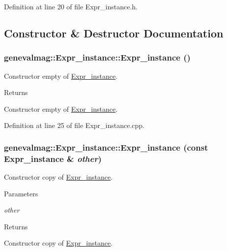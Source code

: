Definition at line 20 of file Expr\_\-instance.h.



\subsection{Constructor \& Destructor Documentation}
\hypertarget{classgenevalmag_1_1Expr__instance_af83f87581558a7d2c05f18a1678050a2}{
\subsubsection[{Expr\_\-instance}]{\setlength{\rightskip}{0pt plus 5cm}genevalmag::Expr\_\-instance::Expr\_\-instance ()}}
\label{classgenevalmag_1_1Expr__instance_af83f87581558a7d2c05f18a1678050a2}
Constructor empty of \hyperlink{classgenevalmag_1_1Expr__instance}{Expr\_\-instance}. \begin{DoxyReturn}{Returns}

\end{DoxyReturn}
Constructor empty of \hyperlink{classgenevalmag_1_1Expr__instance}{Expr\_\-instance}. 

Definition at line 25 of file Expr\_\-instance.cpp.

\hypertarget{classgenevalmag_1_1Expr__instance_a52ec40835f95f35c7131036873e1a14d}{
\subsubsection[{Expr\_\-instance}]{\setlength{\rightskip}{0pt plus 5cm}genevalmag::Expr\_\-instance::Expr\_\-instance (const {\bf Expr\_\-instance} \& {\em other})}}
\label{classgenevalmag_1_1Expr__instance_a52ec40835f95f35c7131036873e1a14d}
Constructor copy of \hyperlink{classgenevalmag_1_1Expr__instance}{Expr\_\-instance}. 
\begin{DoxyParams}{Parameters}
\item[{\em other}]\end{DoxyParams}
\begin{DoxyReturn}{Returns}

\end{DoxyReturn}
Constructor copy of \hyperlink{classgenevalmag_1_1Expr__instance}{Expr\_\-instance}. 

